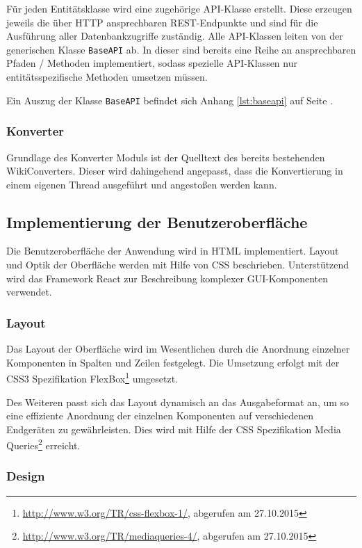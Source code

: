 \documentclass[12pt, xcolor=dvipsnames]{scrartcl}
\begin{document}
Für jeden Entitätsklasse wird eine zugehörige API-Klasse erstellt. Diese erzeugen jeweils die über HTTP ansprechbaren REST-Endpunkte und sind für die Ausführung aller Datenbankzugriffe zuständig. Alle API-Klassen leiten von der generischen Klasse \texttt{BaseAPI} ab. In dieser sind bereits eine Reihe an ansprechbaren Pfaden / Methoden implementiert, sodass spezielle API-Klassen nur entitätsspezifische Methoden umsetzen müssen.

Ein Auszug der Klasse \texttt{BaseAPI} befindet sich Anhang \ref{lst:baseapi} auf Seite \pageref{lst:baseapi}.

\subsubsection*{Konverter}

Grundlage des Konverter Moduls ist der Quelltext des bereits bestehenden WikiConverters. Dieser wird dahingehend angepasst, dass die Konvertierung in einem eigenen Thread ausgeführt und angestoßen werden kann.

\subsection{Implementierung der Benutzeroberfläche}

Die Benutzeroberfläche der Anwendung wird in HTML implementiert.
Layout und Optik der Oberfläche werden mit Hilfe von CSS beschrieben. 
Unterstützend wird das Framework React zur Beschreibung komplexer GUI-Komponenten verwendet.

\subsubsection*{Layout}

Das Layout der Oberfläche wird im Wesentlichen durch die Anordnung einzelner Komponenten in Spalten und Zeilen festgelegt.
Die Umsetzung erfolgt mit der CSS3 Spezifikation
FlexBox\footnote{\url{http://www.w3.org/TR/css-flexbox-1/}, abgerufen am 27.10.2015} umgesetzt.

Des Weiteren passt sich das Layout dynamisch an das Ausgabeformat an, um so eine effiziente Anordnung der einzelnen Komponenten auf verschiedenen Endgeräten zu gewährleisten. Dies wird mit Hilfe der CSS Spezifikation
Media Queries\footnote{\url{http://www.w3.org/TR/mediaqueries-4/}, abgerufen am 27.10.2015} erreicht.

\subsubsection*{Design}
\end{document}

